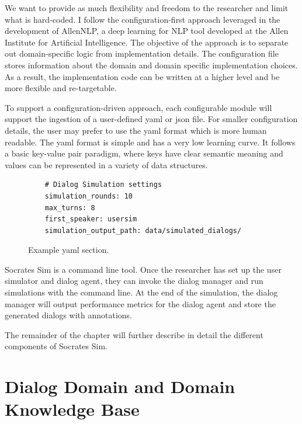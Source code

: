 We want to provide as much flexibility and freedom to the researcher and limit what is hard-coded. I follow the configuration-first approach leveraged in the development of AllenNLP, a deep learning for NLP tool developed at the Allen Institute for Artificial Intelligence. The objective of the approach is to separate out domain-specific logic from implementation details. The configuration file stores information about the domain and domain specific implementation choices. As a result, the implementation code can be written at a higher level and be more flexible and re-targetable. 

To support a configuration-driven approach, each configurable module will support the ingestion of a user-defined yaml or json file. For smaller configuration details, the user may prefer to use the yaml format which is more human readable. The yaml format is simple and has a very low learning curve. It follows a basic key-value pair paradigm, where keys have clear semantic meaning and values can be represented in a variety of data structures. 

\begin{figure}[h!]
	\begin{lstlisting}
	# Dialog Simulation settings
	simulation_rounds: 10
	max_turns: 8
	first_speaker: usersim
	simulation_output_path: data/simulated_dialogs/
	\end{lstlisting}
	\caption{Example yaml section.}
	\label{fig:ex_yaml}
\end{figure}

Socrates Sim is a command line tool. Once the researcher has set up the user simulator and dialog agent, they can invoke the dialog manager and run simulations with the command line. At the end of the simulation, the dialog manager will output performance metrics for the dialog agent and store the generated dialogs with annotations.

The remainder of the chapter will further describe in detail the different components of Socrates Sim.

\section{Dialog Domain and Domain Knowledge Base}
\label{sssec:dialog_domain}

